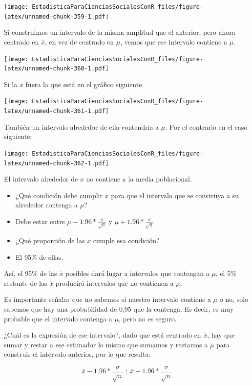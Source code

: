 \documentclass[]{book}
\begin{document}
\texttt{[image: EstadisticaParaCienciasSocialesConR\_files/figure-latex/unnamed-chunk-359-1.pdf]}

Si construimos un intervalo de la misma amplitud que el anterior, pero
ahora centrado en \(\overline{x}\), en vez de centrado en \(\mu\), vemos que
ese intervalo contiene a \(\mu\).

\texttt{[image: EstadisticaParaCienciasSocialesConR\_files/figure-latex/unnamed-chunk-360-1.pdf]}

Si la \(\overline{x}\) fuera la que está
en el gráfico siguiente.

\texttt{[image: EstadisticaParaCienciasSocialesConR\_files/figure-latex/unnamed-chunk-361-1.pdf]}

También un intervalo alrededor de ella contendría a \(\mu\). Por el
contrario en el caso siguiente:

\texttt{[image: EstadisticaParaCienciasSocialesConR\_files/figure-latex/unnamed-chunk-362-1.pdf]}

El intervalo alrededor de \(\overline{x}\) no contiene a la media
poblacional.

\begin{itemize}
\item
  ¿Qué condición debe cumplir \(\overline{x}\) para que el intervalo que
  se construya a su alrededor contenga a \(\mu\)?
\item
  Debe estar entre \(\mu - 1.96*\frac{\sigma}{\sqrt{n}}\) y \(\mu + 1.96*\frac{\sigma}{\sqrt{n}}\)
\item
  ¿Qué proporción de las \(\overline{x}\) cumple esa condición?
\item
  El 95\% de ellas.
\end{itemize}

Así, el 95\% de las \(\overline{x}\) posibles dará lugar a intervalos que
contengan a \(\mu\), el 5\% restante de las \(\overline{x}\) producirá
intervalos que no contienen a \(\mu\).

Es importante señalar que no sabemos si nuestro intervalo contiene a
\(\mu\) o no, solo sabemos que hay una probabilidad de 0,95 que la
contenga. Es decir, es muy probable que el intervalo contenga a \(\mu\),
pero no es seguro.

¿Cuál es la expresión de ese intervalo?, dado que está centrado en
\(\overline{x}\), hay que sumar y restar a ese estimador lo mismo que
sumamos y restamos a \(\mu\) para construir el intervalo anterior, por lo
que resulta:

\[\overline{x} - 1.96*\frac{\sigma}{\sqrt{n}}\ ;\ \overline{x} + 1.96*\frac{\sigma}{\sqrt{n}}\]
\end{document}
